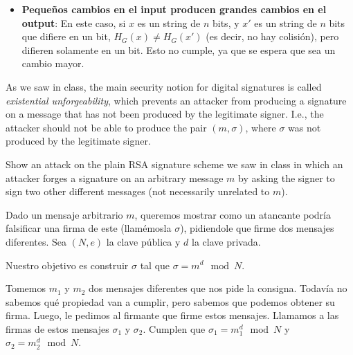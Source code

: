 \documentclass[12pt,addpoints,answers]{exam}
\begin{document}
\begin{questions}
\begin{solution}
\begin{itemize}
    Esto tampoco lo cumple. En el caso de que $x$ \textbf{no} sea un string de $n$ bits,
    es factible encontrarlo. Tomemos $x' = H_G(x)$. Por definición de $H_G$, su codominio
    es de $n$ bits. Por lo tanto, $x' \neq x$ (pues $x$ no es de $n$ bits) y 
    vemos que $H_G(x') = H_G(H_G(x)) = H_G(x)$.

    En el caso de que $x$ sea un string de $n$ bits, es más difícil. Ahí sí tenemos que
    buscar sobre todo el espacio de los strings que no sean de $n$ bits para encontrar otro.

    \item \textbf{Pequeños cambios en el input producen grandes cambios en el output}:
    En este caso, si $x$ es un string de $n$ bits, y $x'$ es un string de $n$ bits
    que difiere en un bit, $H_G(x) \neq H_G(x')$ (es decir, no hay colisión), pero difieren solamente en un bit.
    Esto no cumple, ya que se espera que sea un cambio mayor.
    
   \end{itemize}

\end{solution}

\newpage

\question[10] As we saw in class, the main security notion for digital signatures is called {\em existential unforgeability}, which prevents an attacker from producing a signature on a message that has not been produced by the legitimate signer. I.e., the attacker should not be able to produce the pair $(m, \sigma)$, where $\sigma$ was not produced by the legitimate signer. 

Show an attack on the plain RSA signature scheme we saw in class in which an attacker forges a signature on an arbitrary message $m$ by asking the signer to sign two other different messages (not necessarily unrelated to $m$).

\begin{solution} %
    Dado un mensaje arbitrario $m$, queremos mostrar como un atancante podría falsificar 
    una firma de este (llamémosla $\sigma$), pidiendole que firme dos mensajes diferentes.
    Sea $(N, e)$ la clave pública y $d$ la clave privada.

    Nuestro objetivo es construir $\sigma$ tal que $\sigma = m^d \mod N$.

    Tomemos $m_1$ y $m_2$ dos mensajes diferentes que nos pide la consigna. 
    Todavía no sabemos qué propiedad van a cumplir, pero sabemos que podemos obtener su firma.
    Luego, le pedimos al firmante que firme estos mensajes. 
    Llamamos a las firmas de estos mensajes $\sigma_1$ y $\sigma_2$. 
    Cumplen que $\sigma_1 = m_1^d \mod N$ y $\sigma_2 = m_2^d \mod N$.
    

\end{solution}
\end{questions}
\end{document}
